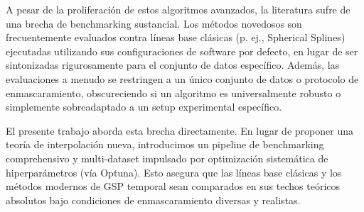 A pesar de la proliferación de estos algoritmos avanzados, la literatura sufre de una brecha de benchmarking sustancial. Los métodos novedosos son frecuentemente evaluados contra líneas base clásicas (p. ej., Spherical Splines) ejecutadas utilizando sus configuraciones de software por defecto, en lugar de ser sintonizadas rigurosamente para el conjunto de datos específico. Además, las evaluaciones a menudo se restringen a un único conjunto de datos o protocolo de enmascaramiento, obscureciendo si un algoritmo es universalmente robusto o simplemente sobreadaptado a un setup experimental específico.

El presente trabajo aborda esta brecha directamente. En lugar de proponer una teoría de interpolación nueva, introducimos un pipeline de benchmarking comprehensivo y multi-dataset impulsado por optimización sistemática de hiperparámetros (vía Optuna). Esto asegura que las líneas base clásicas y los métodos modernos de GSP temporal sean comparados en sus techos teóricos absolutos bajo condiciones de enmascaramiento diversas y realistas.
